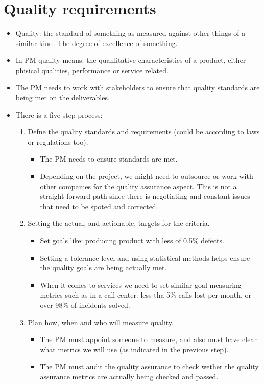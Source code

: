 \section{Quality requirements}
\begin{itemize}
    \item Quality: the standard of something as measured against other things of a similar kind. The degree of excellence of something.
    \item In PM quality means: the quanlitative characteristics of a product, either phisical qualities, performance or service related.
    \item The PM needs to work with stakeholders to ensure that quality standards are being met on the deliverables.
    \item There is a five step process:
        \begin{enumerate}
            \item Defne the quality standards and requirements (could be according to laws or regulations too).
                \begin{itemize}
                    \item The PM needs to ensure standards are met.
                    \item Depending on the project, we might need to outsource or work with other companies for the quality assurance aspect. This is not a straight forward path since there is negotiating and constant issues that need to be spoted and corrected.
                \end{itemize}

            \item Setting the actual, and actionable, targets for the criteria.
                \begin{itemize}
                    \item Set goals like: producing product with less of 0.5\% defects. 
                    \item Setting a tolerance level and using statistical methods helps ensure the quality goals are being actually met.
                    \item When it comes to services we need to set similar goal measuring metrics such as in a call center: less tha 5\% calls lost per month, or over 98\% of incidents solved.
                \end{itemize}
            
            \item Plan how, when and who will measure quality.
                \begin{itemize}
                    \item The PM must appoint someone to measure, and also must have clear what metrics we will use (as indicated in the previous step).
                    \item The PM must audit the quality assurance to check wether the quality assurance metrics are actually being checked and passed.
                \end{itemize}
            

\end{enumerate}
\end{itemize}
